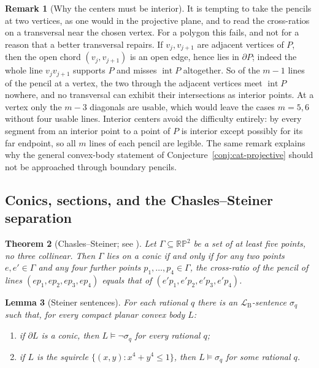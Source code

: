 \documentclass[11pt]{amsart}
\newtheorem{theorem}{Theorem}[section]
\newtheorem{lemma}[theorem]{Lemma}
\theoremstyle{definition}
\newtheorem{remark}[theorem]{Remark}
\newcommand{\RP}{\mathbb{RP}}
\newcommand{\LB}{\mathcal{L}_{\mathrm{B}}}
\newcommand{\interior}{\operatorname{int}}
\begin{document}
\begin{remark}[Why the centers must be interior]\label{rem:vertex-pencils}
It is tempting to take the pencils at two vertices, as one would in the
projective plane, and to read the cross-ratios on a transversal near the
chosen vertex. For a polygon this fails, and not for a reason that a better
transversal repairs. If $v_j,v_{j+1}$ are adjacent vertices of $P$, then the
open chord $(v_j,v_{j+1})$ is an open edge, hence lies in $\partial P$;
indeed the whole line $v_jv_{j+1}$ supports $P$ and misses $\interior P$
altogether. So of the $m-1$ lines of the pencil at a vertex, the two through
the adjacent vertices meet $\interior P$ nowhere, and no transversal can
exhibit their intersections as interior points. At a vertex only the $m-3$
diagonals are usable, which would leave the cases $m=5,6$ without four
usable lines. Interior centers avoid the difficulty entirely: by
\cite[Lemma~1.1.9]{Schneider14} every segment from an interior point to a
point of $P$ is interior except possibly for its far endpoint, so all $m$
lines of each pencil are legible. The same remark explains why the general
convex-body statement of Conjecture~\ref{conj:cat-projective} should not be
approached through boundary pencils.
\end{remark}

\subsection{Conics, sections, and the Chasles--Steiner separation}

\begin{theorem}[Chasles--Steiner; see {\cite[Ch.~8]{Coxeter49}}]\label{thm:steiner}
Let $\Gamma\subseteq\RP^2$ be a set of at least five points, no three
collinear. Then $\Gamma$ lies on a conic if and only if for any two points
$e,e'\in\Gamma$ and any four further points
$p_1,\dots,p_4\in\Gamma$, the cross-ratio of the pencil of lines
$(e p_1,e p_2,e p_3,e p_4)$ equals that of
$(e' p_1,e' p_2,e' p_3,e' p_4)$.
\end{theorem}

\begin{lemma}[Steiner sentences]\label{lem:steiner-sentences}
For each rational $q$ there is an
$\LB$-sentence $\sigma_q$ such that, for every compact planar convex body
$L$:
\begin{enumerate}[label=\textup{(\alph*)}]
\item if $\partial L$ is a conic, then $L\models\neg\sigma_q$ for every
rational $q$;
\item if $L$ is the squircle $\{(x,y):x^4+y^4\le1\}$, then
$L\models\sigma_q$ for some rational $q$.
\end{enumerate}
\end{lemma}
\end{document}
